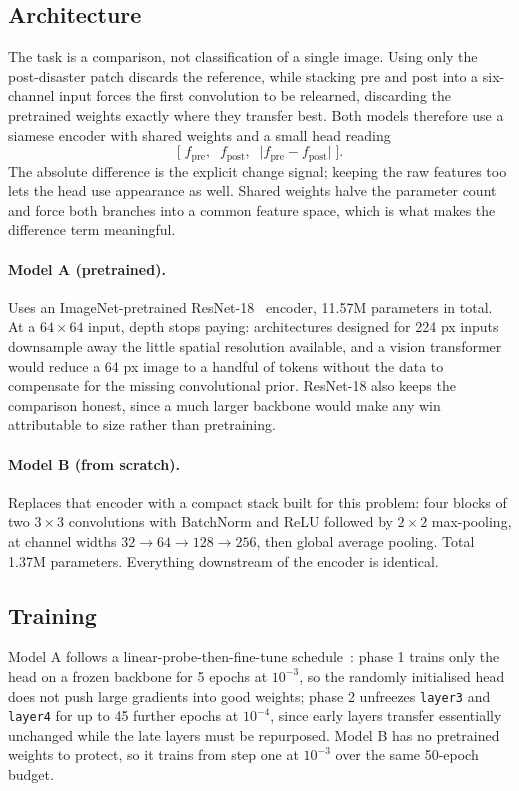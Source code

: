 \documentclass[10pt,twocolumn]{article}
\begin{document}
\subsection{Architecture}
\label{sec:arch}

The task is a comparison, not classification of a single image. Using only the post-disaster patch
discards the reference, while stacking pre and post into a six-channel input forces the first
convolution to be relearned, discarding the pretrained weights exactly where they transfer best.
Both models therefore use a siamese encoder with shared weights and a small head reading
\[
\big[\;f_{\text{pre}},\;\; f_{\text{post}},\;\; \lvert f_{\text{pre}} - f_{\text{post}}\rvert\;\big].
\]
The absolute difference is the explicit change signal; keeping the raw features too lets the head use
appearance as well. Shared weights halve the parameter count and force both branches into a common
feature space, which is what makes the difference term meaningful.

\paragraph{Model A (pretrained).} Uses an ImageNet-pretrained ResNet-18~\cite{resnet,imagenet} encoder,
11.57M parameters in total. At a $64\times64$ input, depth stops paying: architectures designed for
224 px inputs downsample away the little spatial resolution available, and a vision transformer would
reduce a 64 px image to a handful of tokens without the data to compensate for the missing
convolutional prior. ResNet-18 also keeps the comparison honest, since a much larger backbone would
make any win attributable to size rather than pretraining.

\paragraph{Model B (from scratch).} Replaces that encoder with a compact stack built for this problem:
four blocks of two $3\times3$ convolutions with BatchNorm and ReLU followed by $2\times2$
max-pooling, at channel widths $32 \to 64 \to 128 \to 256$, then global average pooling. Total 1.37M
parameters. Everything downstream of the encoder is identical.

\subsection{Training}

Model A follows a linear-probe-then-fine-tune schedule~\cite{lpft}: phase 1 trains only the head on a
frozen backbone for 5 epochs at $10^{-3}$, so the randomly initialised head does not push large
gradients into good weights; phase 2 unfreezes \texttt{layer3} and \texttt{layer4} for up to 45
further epochs at $10^{-4}$, since early layers transfer essentially unchanged while the late layers
must be repurposed. Model B has no pretrained weights to protect, so it trains from step one at
$10^{-3}$ over the same 50-epoch budget.
\end{document}
